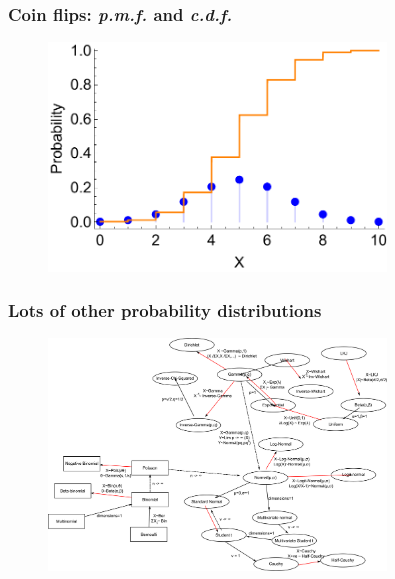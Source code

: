 \documentclass{beamer}
\begin{document}
	\begin{frame}
		\frametitle{Coin flips: \textit{p.m.f.} and \textit{c.d.f.}}
		
		\begin{figure}[ht]
			\includegraphics[width=0.8\textwidth]{./figures/binomial_cdf_2.pdf}
		\end{figure}
		
	\end{frame}
	
	\begin{frame}
		\frametitle{Lots of other probability distributions}
		
		\begin{figure}[h]
			\centerline{\includegraphics[width=0.8\textwidth]{figures/Distributions_nexusOfRelations.pdf}}
		\end{figure}
	
	\end{frame}
	
\end{document}
